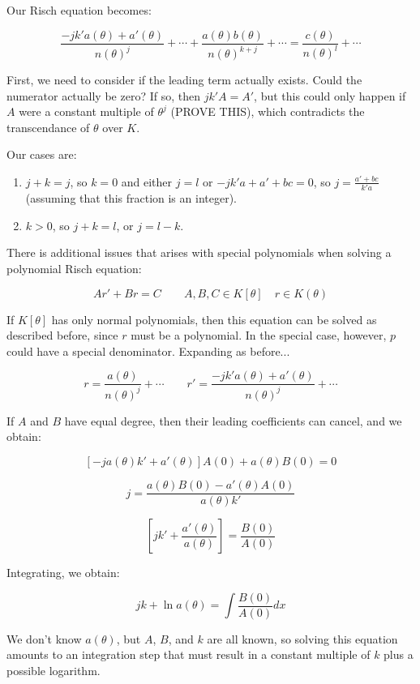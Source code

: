 Our Risch equation becomes:

$$\frac{-j k' a(\theta) + a'(\theta)}{n(\theta)^{j}} + \cdots + \frac{a(\theta)b(\theta)}{n(\theta)^{k+j}} + \cdots
= \frac{c(\theta)}{n(\theta)^l} + \cdots$$

First, we need to consider if the leading term actually exists.  Could the numerator
actually be zero?  If so, then $j k' A = A'$, but this could only happen if $A$
were a constant multiple of $\theta^j$ (PROVE THIS), which contradicts the
transcendance of $\theta$ over $K$.

Our cases are:

\begin{enumerate}
\item $j+k = j$, so $k=0$ and either $j=l$ or $-j k' a + a' + b c = 0$,
so $j = \frac{a' + b c}{k' a}$ (assuming that this fraction is an integer).
\item $k>0$, so $j+k=l$, or $j=l-k$.
\end{enumerate}

There is additional issues that arises with special polynomials when
solving a polynomial Risch equation:

$$A r' + B r = C \qquad A,B,C \in K[\theta] \quad r \in K(\theta)$$

If $K[\theta]$ has only normal polynomials, then this equation can be
solved as described before, since $r$ must be a polynomial.
In the special case, however, $p$ could have a special denominator.
Expanding as before...

$$r = \frac{a(\theta)}{n(\theta)^j} + \cdots  \qquad  r' = \frac{-j k' a(\theta) + a'(\theta)}{n(\theta)^{j}} + \cdots$$

If $A$ and $B$ have equal degree, then their leading coefficients can cancel, and we obtain:

$$\left[ -ja(\theta)k' + a'(\theta) \right] A(0) + a(\theta) B(0) = 0$$

$$j = \frac{a(\theta) B(0) - a'(\theta) A(0)}{a(\theta)k'}$$

$$\left[ jk' + \frac{a'(\theta)}{a(\theta) } \right] = \frac{B(0)}{A(0)}$$

Integrating, we obtain:

$$ jk + \ln a(\theta) = \int \frac{B(0)}{A(0)} dx$$

We don't know $a(\theta)$, but $A$, $B$, and $k$ are all known, so solving
this equation amounts to an integration step that must result in a
constant multiple of $k$ plus a possible logarithm.

